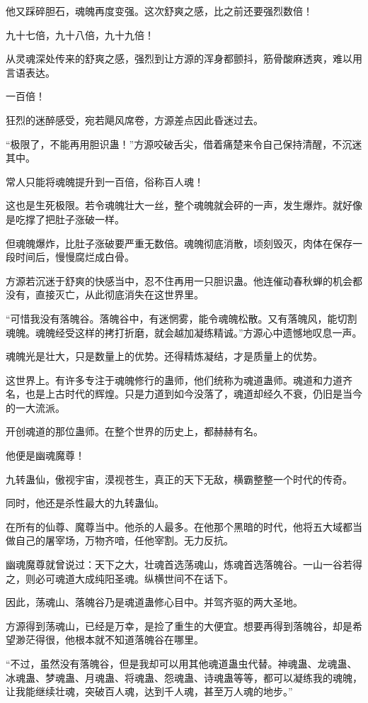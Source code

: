\begin{this_body}
他又踩碎胆石，魂魄再度变强。这次舒爽之感，比之前还要强烈数倍！

九十七倍，九十八倍，九十九倍！

从灵魂深处传来的舒爽之感，强烈到让方源的浑身都颤抖，筋骨酸麻透爽，难以用言语表达。

一百倍！

狂烈的迷醉感受，宛若飓风席卷，方源差点因此昏迷过去。

“极限了，不能再用胆识蛊！”方源咬破舌尖，借着痛楚来令自己保持清醒，不沉迷其中。

常人只能将魂魄提升到一百倍，俗称百人魂！

这也是生死极限。若令魂魄壮大一丝，整个魂魄就会砰的一声，发生爆炸。就好像是吃撑了把肚子涨破一样。

但魂魄爆炸，比肚子涨破要严重无数倍。魂魄彻底消散，顷刻毁灭，肉体在保存一段时间后，慢慢腐烂成白骨。

方源若沉迷于舒爽的快感当中，忍不住再用一只胆识蛊。他连催动春秋蝉的机会都没有，直接灭亡，从此彻底消失在这世界里。

“可惜我没有落魄谷。落魄谷中，有迷惘雾，能令魂魄松散。又有落魄风，能切割魂魄。魂魄经受这样的拷打折磨，就会越加凝练精诚。”方源心中遗憾地叹息一声。

魂魄光是壮大，只是数量上的优势。还得精炼凝结，才是质量上的优势。

这世界上。有许多专注于魂魄修行的蛊师，他们统称为魂道蛊师。魂道和力道齐名，也是上古时代的辉煌。只是力道到如今没落了，魂道却经久不衰，仍旧是当今的一大流派。

开创魂道的那位蛊师。在整个世界的历史上，都赫赫有名。

他便是幽魂魔尊！

九转蛊仙，傲视宇宙，漠视苍生，真正的天下无敌，横霸整整一个时代的传奇。

同时，他还是杀性最大的九转蛊仙。

在所有的仙尊、魔尊当中。他杀的人最多。在他那个黑暗的时代，他将五大域都当做自己的屠宰场，万物齐喑，任他宰割。无力反抗。

幽魂魔尊就曾说过：天下之大，壮魂首选荡魂山，炼魂首选落魄谷。一山一谷若得之，则必可魂道大成纯阳圣魂。纵横世间不在话下。

因此，荡魂山、落魄谷乃是魂道蛊修心目中。并驾齐驱的两大圣地。

方源得到荡魂山，已经是万幸，是捡了重生的大便宜。想要再得到落魄谷，却是希望渺茫得很，他根本就不知道落魄谷在哪里。

“不过，虽然没有落魄谷，但是我却可以用其他魂道蛊虫代替。神魂蛊、龙魂蛊、冰魂蛊、梦魂蛊、月魂蛊、将魂蛊、怨魂蛊、诗魂蛊等等，都可以凝练我的魂魄，让我能继续壮魂，突破百人魂，达到千人魂，甚至万人魂的地步。”


\end{this_body}
